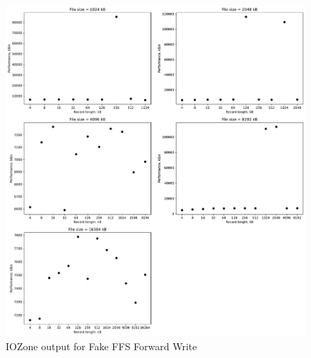 \begin{figure}[!htb]
	\label{fig:app_bench_fffs_rnd_read}
	\begin{center}
		\includegraphics[width=1.0\textwidth]{figures/benchmarking/fake-ffs/Writer.pdf}
	\end{center}
	\caption{IOZone output for Fake FFS Forward Write}
\end{figure}

